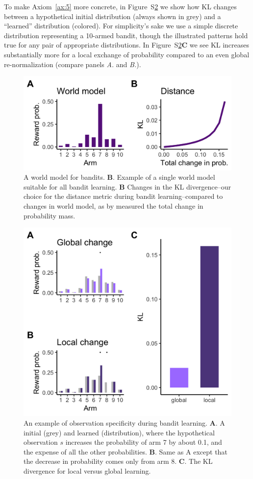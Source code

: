 To make Axiom~\ref{ax:5} more concrete, in Figure~S\ref{fig:supf2} we show how KL changes between a hypothetical initial distribution (always shown in grey) and a ``learned'' distribution (colored). For simplicity's sake we use a simple discrete distribution representing a 10-armed bandit, though the illustrated patterns hold true for any pair of appropriate distributions. In Figure~S\ref{fig:supf2}\textbf{C} we see KL increases substantially more for a local exchange of probability compared to an even global re-normalization (compare panels \textit{A.} and \textit{B.}). 

\begin{figure}
	[tbhp] \centering 
	\includegraphics[width=0.5\linewidth]{figures/subfig1.png} 
	\caption{\label{fig:supf1} A world model for bandits.
	\textbf{B}. Example of a single world model suitable for all bandit learning.
	\textbf{B} Changes in the KL divergence--our choice for the distance metric during bandit learning--compared to changes in world model, as by measured the total change in probability mass.}
\end{figure}

\begin{figure}
	[tbhp] \centering 
	\includegraphics[width=.5\linewidth]{figures/subfig2.png} 
	\caption{\label{fig:supf2} An example of observation specificity during bandit learning. 
	\textbf{A}. A initial (grey) and learned (distribution), where the hypothetical observation $s$ increases the probability of arm 7 by about 0.1, and the expense of all the other probabilities.
	\textbf{B}. Same as A except that the decrease in probability comes only from arm 8.
	\textbf{C}. The KL divergence for local versus global learning.
	}
\end{figure}

